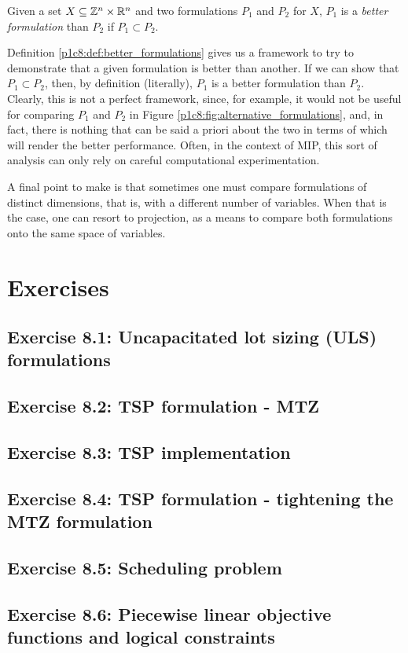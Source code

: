 \begin{definition} \label{p1c8:def:better_formulations}
  Given a set $X\subseteq \mathbb{Z}^n\times\mathbb{R}^n$ and two formulations $P_1$ and $P_2$ for $X$, $P_1$ is a \emph{better formulation} than $P_2$ if $P_1 \subset P_2$. 
\end{definition}

Definition \ref{p1c8:def:better_formulations} gives us a framework to try to demonstrate that a given formulation is better than another. If we can show that $P_1 \subset P_2$, then, by definition (literally), $P_1$ is a better formulation than $P_2$. Clearly, this is not a perfect framework, since, for example, it would not be useful for comparing $P_1$ and $P_2$ in Figure \ref{p1c8:fig:alternative_formulations}, and, in fact, there is nothing that can be said a priori about the two in terms of which will render the better performance. Often, in the context of MIP, this sort of analysis can only rely on careful computational experimentation. 

A final point to make is that sometimes one must compare formulations of distinct dimensions, that is, with a different number of variables. When that is the case, one can resort to projection, as a means to compare both formulations onto the same space of variables. 

\newpage
\section{Exercises}

\subsection*{Exercise 8.1: Uncapacitated lot sizing (ULS) formulations}


\subsection*{Exercise 8.2: TSP formulation - MTZ}


\subsection*{Exercise 8.3: TSP implementation}


\subsection*{Exercise 8.4: TSP formulation - tightening the MTZ formulation}


\subsection*{Exercise 8.5: Scheduling problem}


\subsection*{Exercise 8.6: Piecewise linear objective functions and logical constraints}


